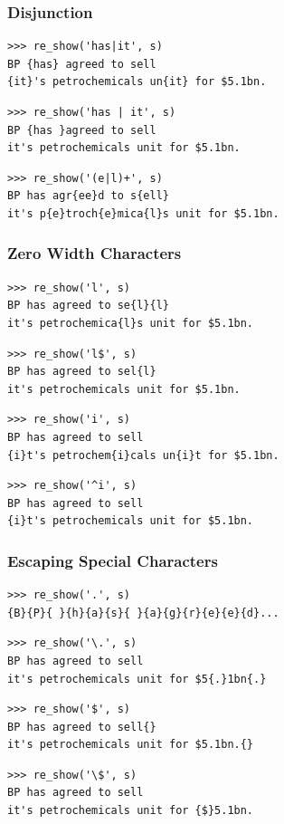 \begin{frame}[fragile]
\frametitle{Disjunction}


\begin{verbatim}
>>> re_show('has|it', s)
BP {has} agreed to sell
{it}'s petrochemicals un{it} for $5.1bn.
\end{verbatim}

\begin{verbatim}
>>> re_show('has | it', s)
BP {has }agreed to sell
it's petrochemicals unit for $5.1bn.
\end{verbatim}

\begin{verbatim}
>>> re_show('(e|l)+', s)
BP has agr{ee}d to s{ell}
it's p{e}troch{e}mica{l}s unit for $5.1bn.
\end{verbatim}
\end{frame}


\begin{frame}[fragile]
\frametitle{Zero Width Characters}


\begin{verbatim}
>>> re_show('l', s)
BP has agreed to se{l}{l}
it's petrochemica{l}s unit for $5.1bn.
\end{verbatim}

\begin{verbatim}
>>> re_show('l$', s)
BP has agreed to sel{l}
it's petrochemicals unit for $5.1bn.
\end{verbatim}

\begin{verbatim}
>>> re_show('i', s)
BP has agreed to sell
{i}t's petrochem{i}cals un{i}t for $5.1bn.
\end{verbatim}

\begin{verbatim}
>>> re_show('^i', s)
BP has agreed to sell
{i}t's petrochemicals unit for $5.1bn.
\end{verbatim}

\end{frame}


\begin{frame}[fragile]
\frametitle{Escaping Special Characters}


\begin{verbatim}
>>> re_show('.', s)
{B}{P}{ }{h}{a}{s}{ }{a}{g}{r}{e}{e}{d}...
\end{verbatim}

\begin{verbatim}
>>> re_show('\.', s)
BP has agreed to sell
it's petrochemicals unit for $5{.}1bn{.}
\end{verbatim}

\begin{verbatim}
>>> re_show('$', s)
BP has agreed to sell{}
it's petrochemicals unit for $5.1bn.{}
\end{verbatim}

\begin{verbatim}
>>> re_show('\$', s)
BP has agreed to sell
it's petrochemicals unit for {$}5.1bn.
\end{verbatim}
\end{frame}

